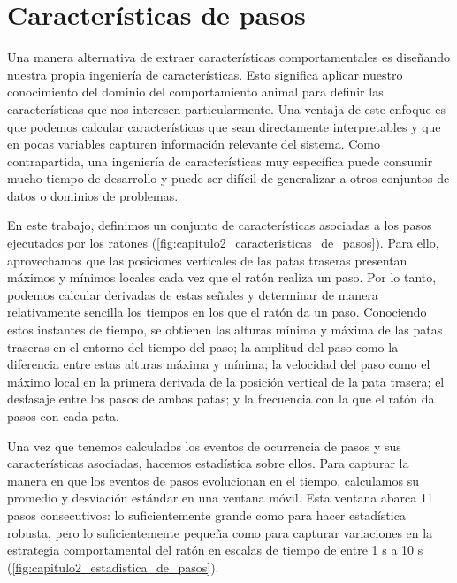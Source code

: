 \section{Características de pasos}\label{sec:caracteristicas_pasos}

Una manera alternativa de extraer características comportamentales es diseñando nuestra propia ingeniería de características. Esto significa aplicar nuestro conocimiento del dominio del comportamiento animal para definir las características que nos interesen particularmente. Una ventaja de este enfoque es que podemos calcular características que sean directamente interpretables y que en pocas variables capturen información relevante del sistema. Como contrapartida, una ingeniería de características muy específica puede consumir mucho tiempo de desarrollo y puede ser difícil de generalizar a otros conjuntos de datos o dominios de problemas.

En este trabajo, definimos un conjunto de características asociadas a los pasos ejecutados por los ratones (\autoref{fig:capitulo2_caracteristicas_de_pasos}). Para ello, aprovechamos que las posiciones verticales de las patas traseras presentan máximos y mínimos locales cada vez que el ratón realiza un paso. Por lo tanto, podemos calcular derivadas de estas señales y determinar de manera relativamente sencilla los tiempos en los que el ratón da un paso. Conociendo estos instantes de tiempo, se obtienen las alturas mínima y máxima de las patas traseras en el entorno del tiempo del paso; la amplitud del paso como la diferencia entre estas alturas máxima y mínima; la velocidad del paso como el máximo local en la primera derivada de la posición vertical de la pata trasera; el desfasaje entre los pasos de ambas patas; y la frecuencia con la que el ratón da pasos con cada pata.

Una vez que tenemos calculados los eventos de ocurrencia de pasos y sus características asociadas, hacemos estadística sobre ellos. Para capturar la manera en que los eventos de pasos evolucionan en el tiempo, calculamos su promedio y desviación estándar en una ventana móvil. Esta ventana abarca 11 pasos consecutivos: lo suficientemente grande como para hacer estadística robusta, pero lo suficientemente pequeña como para capturar variaciones en la estrategia comportamental del ratón en escalas de tiempo de entre 1 s a 10 s (\autoref{fig:capitulo2_estadistica_de_pasos}).

